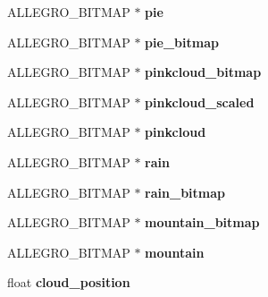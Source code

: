 \begin{DoxyCompactItemize}
\item 
\hypertarget{structMenu_a397eb035f88ef8138c4ba29f3fc1d63c}{\-A\-L\-L\-E\-G\-R\-O\-\_\-\-B\-I\-T\-M\-A\-P $\ast$ {\bfseries pie}}\label{structMenu_a397eb035f88ef8138c4ba29f3fc1d63c}

\item 
\hypertarget{structMenu_ab46ce3041264bac0aabde3abd7549877}{\-A\-L\-L\-E\-G\-R\-O\-\_\-\-B\-I\-T\-M\-A\-P $\ast$ {\bfseries pie\-\_\-bitmap}}\label{structMenu_ab46ce3041264bac0aabde3abd7549877}

\item 
\hypertarget{structMenu_a970ef9c492ae797fc59d22fa6cfead71}{\-A\-L\-L\-E\-G\-R\-O\-\_\-\-B\-I\-T\-M\-A\-P $\ast$ {\bfseries pinkcloud\-\_\-bitmap}}\label{structMenu_a970ef9c492ae797fc59d22fa6cfead71}

\item 
\hypertarget{structMenu_a9318c6d43e6a403a50df82c18370a04e}{\-A\-L\-L\-E\-G\-R\-O\-\_\-\-B\-I\-T\-M\-A\-P $\ast$ {\bfseries pinkcloud\-\_\-scaled}}\label{structMenu_a9318c6d43e6a403a50df82c18370a04e}

\item 
\hypertarget{structMenu_aec110fca9c47ccf9aaf6e4e7589b86f2}{\-A\-L\-L\-E\-G\-R\-O\-\_\-\-B\-I\-T\-M\-A\-P $\ast$ {\bfseries pinkcloud}}\label{structMenu_aec110fca9c47ccf9aaf6e4e7589b86f2}

\item 
\hypertarget{structMenu_a3ba357f6bd47ac51f9aa9b9c381bbe9f}{\-A\-L\-L\-E\-G\-R\-O\-\_\-\-B\-I\-T\-M\-A\-P $\ast$ {\bfseries rain}}\label{structMenu_a3ba357f6bd47ac51f9aa9b9c381bbe9f}

\item 
\hypertarget{structMenu_a9207cdbfc8c670d9069c9a2c64c6ca95}{\-A\-L\-L\-E\-G\-R\-O\-\_\-\-B\-I\-T\-M\-A\-P $\ast$ {\bfseries rain\-\_\-bitmap}}\label{structMenu_a9207cdbfc8c670d9069c9a2c64c6ca95}

\item 
\hypertarget{structMenu_a115b21e5dcfdcf1393e3b5d3b041a7b7}{\-A\-L\-L\-E\-G\-R\-O\-\_\-\-B\-I\-T\-M\-A\-P $\ast$ {\bfseries mountain\-\_\-bitmap}}\label{structMenu_a115b21e5dcfdcf1393e3b5d3b041a7b7}

\item 
\hypertarget{structMenu_a3a957c0b3a961e3c2be9001c15e82208}{\-A\-L\-L\-E\-G\-R\-O\-\_\-\-B\-I\-T\-M\-A\-P $\ast$ {\bfseries mountain}}\label{structMenu_a3a957c0b3a961e3c2be9001c15e82208}

\item 
\hypertarget{structMenu_a0e6c60743147ff2ead1e0bb2f89d0036}{float {\bfseries cloud\-\_\-position}}\label{structMenu_a0e6c60743147ff2ead1e0bb2f89d0036}


\end{DoxyCompactItemize}
